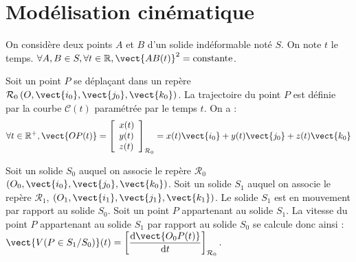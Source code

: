 \setchapterpreamble[u]{\margintoc}

\chapter{Modélisation cinématique}

\marginnote[8cm]{
}

% 


\begin{defi} 
On considère deux points $A$ et $B$ d'un solide indéformable noté $S$. On note $t$ le temps. $
\forall A,B \in S, \forall t\in \mathbb{R}, \vect{AB(t)}^2 = \text{constante}
$.

\end{defi}

\begin{defi} 

Soit un point $P$ se déplaçant dans un repère $\mathcal{R}_0 \left(O,\vect{i_0},\vect{j_0},\vect{k_0} \right)$. La trajectoire du point $P$ est définie par la courbe $\mathcal{C}(t)$ paramétrée par le temps $t$. On a : 
$$
\forall t\in \mathbb{R}^+, \vect{OP(t)}=
\left[
\begin{array}{l}
x(t)\\
y(t)\\
z(t)\\
\end{array}
\right]_{\mathcal{R}_0}
=x(t)\vect{i_0}+y(t)\vect{j_0}+z(t)\vect{k_0}
$$
\end{defi}



\begin{defi} 

Soit un solide $S_0$ auquel on associe le repère $\mathcal{R}_0$ $\left(O_0,\vect{i_0},\vect{j_0},\vect{k_0} \right)$.  Soit un solide $S_1$ auquel on associe le repère $\mathcal{R}_1$,  $\left(O_1,\vect{i_1},\vect{j_1},\vect{k_1} \right)$. Le solide $S_1$ est en mouvement par rapport au solide $S_0$. 
Soit un point $P$ appartenant au solide $S_1$. La vitesse du point $P$ appartenant au solide $S_1$ par rapport au solide $S_0$ se calcule donc ainsi : $
\vect{V(P\in S_1/S_0)}(t) = \left[\dfrac{\text{d}\vect{O_0P(t)}}{\text{d}t}\right]_{\mathcal{R}_0}.
$
\end{defi}


